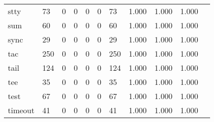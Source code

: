 \begin{longtable}{lp{1.10cm}p{1.10cm}p{1.10cm}p{1.10cm}p{1.10cm}p{1.10cm}p{1.10cm}p{1.10cm}p{1.10cm}p{1.10cm}}
stty      &                     73 &                                  0 &                                 0 &                                0 &                                 0 &                              73 &                          1.000 &                                 1.000 &                               1.000 \\
sum       &                     60 &                                  0 &                                 0 &                                0 &                                 0 &                              60 &                          1.000 &                                 1.000 &                               1.000 \\
sync      &                     29 &                                  0 &                                 0 &                                0 &                                 0 &                              29 &                          1.000 &                                 1.000 &                               1.000 \\
tac       &                    250 &                                  0 &                                 0 &                                0 &                                 0 &                             250 &                          1.000 &                                 1.000 &                               1.000 \\
tail      &                    124 &                                  0 &                                 0 &                                0 &                                 0 &                             124 &                          1.000 &                                 1.000 &                               1.000 \\
tee       &                     35 &                                  0 &                                 0 &                                0 &                                 0 &                              35 &                          1.000 &                                 1.000 &                               1.000 \\
test      &                     67 &                                  0 &                                 0 &                                0 &                                 0 &                              67 &                          1.000 &                                 1.000 &                               1.000 \\
timeout   &                     41 &                                  0 &                                 0 &                                0 &                                 0 &                              41 &                          1.000 &                                 1.000 &                               1.000 \\

\end{longtable}
